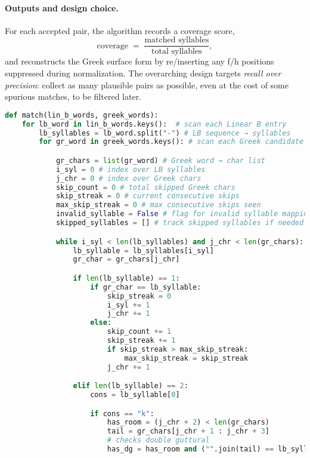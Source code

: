 \paragraph{Outputs and design choice.}
For each accepted pair, the algorithm records a coverage score,
\[
\text{coverage} \;=\; \frac{\text{matched syllables}}{\text{total syllables}},
\]
and reconstructs the Greek surface form by re\-/inserting any f/h positions suppressed during normalization.
The overarching design targets \emph{recall over precision}: collect as many plausible pairs as possible, even at the cost of some spurious matches, to be filtered later.

\begin{lstlisting}[language=Python, caption=Brute-Force matching algorithm, breaklines=true, postbreak=\mbox{\hspace{50pt}\textcolor{red}{$\hookrightarrow$}\space}]
def match(lin_b_words, greek_words):
    for lb_word in lin_b_words.keys():  # scan each Linear B entry
        lb_syllables = lb_word.split("-") # LB sequence → syllables
        for gr_word in greek_words.keys(): # scan each Greek candidate

            gr_chars = list(gr_word) # Greek word → char list
            i_syl = 0 # index over LB syllables
            j_chr = 0 # index over Greek chars
            skip_count = 0 # total skipped Greek chars
            skip_streak = 0 # current consecutive skips
            max_skip_streak = 0 # max consecutive skips seen
            invalid_syllable = False # flag for invalid syllable mapping
            skipped_syllables = [] # track skipped syllables if needed

            while i_syl < len(lb_syllables) and j_chr < len(gr_chars):
                lb_syllable = lb_syllables[i_syl]
                gr_char = gr_chars[j_chr]

                if len(lb_syllable) == 1:
                    if gr_char == lb_syllable:
                        skip_streak = 0
                        i_syl += 1
                        j_chr += 1
                    else:
                        skip_count += 1
                        skip_streak += 1
                        if skip_streak > max_skip_streak:
                            max_skip_streak = skip_streak
                        j_chr += 1

                elif len(lb_syllable) == 2:
                    cons = lb_syllable[0]

                    if cons == "k":
                        has_room = (j_chr + 2) < len(gr_chars)
                        tail = gr_chars[j_chr + 1 : j_chr + 3]
                        # checks double guttural
                        has_dg = has_room and ("".join(tail) == lb_syllable)


\end{lstlisting}
